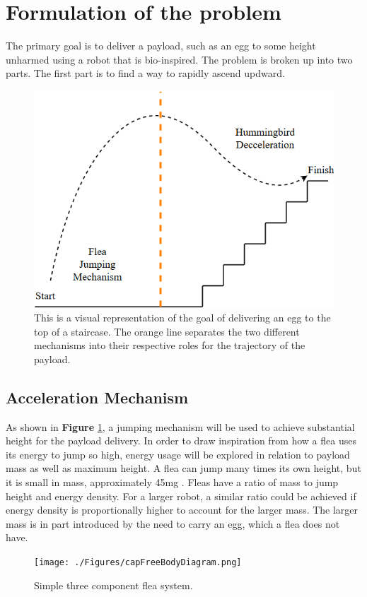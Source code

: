 \section{Formulation of the problem}
\label{Formulation}

\indent The primary goal is to deliver a payload, such as an egg to some height unharmed using a robot that is bio-inspired. The problem is broken up into two parts. The first part is to find a way to rapidly ascend updward.\\

\begin{figure}[H]
\begin{center}
\includegraphics[width=0.75\linewidth]{./Figures/trajectory.png}
\caption{This is a visual representation of the goal of delivering an egg to the top of a staircase. The orange line separates the two different mechanisms into their respective roles for the trajectory of the payload.}
\label{fig:trajectory}
\end{center}
\end{figure}

\subsection{Acceleration Mechanism}
\indent As shown in \textbf{Figure} \ref{fig:trajectory}, a jumping mechanism will be used to achieve substantial height for the payload delivery. In order to draw inspiration from how a flea uses its energy to jump so high, energy usage will be explored in relation to payload mass as well as maximum height. A flea can jump many times its own height, but it is small in mass, approximately 45mg \cite[p.~63]{bennet-clark_jump_nodate}. Fleas have a ratio of mass to jump height and energy density. For a larger robot, a similar ratio could be achieved if energy density is proportionally higher to account for the larger mass. The larger mass is in part introduced by the need to carry an egg, which a flea does not have.\\
\begin{figure}[H]
\begin{center}
\texttt{[image: ./Figures/capFreeBodyDiagram.png]}
\caption{Simple three component flea system.}
\label{fig:capFreeBodyDiagram}
\end{center}
\end{figure}
